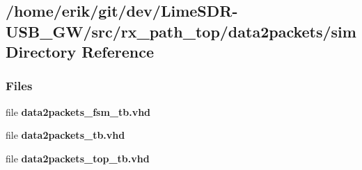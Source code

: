 \subsection{/home/erik/git/dev/\+Lime\+S\+D\+R-\/\+U\+S\+B\+\_\+\+G\+W/src/rx\+\_\+path\+\_\+top/data2packets/sim Directory Reference}
\label{dir_91ac3cf73dcbbd0ebd783eb5f23a07c2}
\subsubsection*{Files}
\begin{DoxyCompactItemize}
\item 
file {\bf data2packets\+\_\+fsm\+\_\+tb.\+vhd}
\item 
file {\bf data2packets\+\_\+tb.\+vhd}
\item 
file {\bf data2packets\+\_\+top\+\_\+tb.\+vhd}
\end{DoxyCompactItemize}
